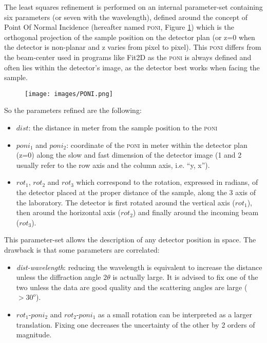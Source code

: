 \documentclass[preprint, pdf]{iucr}              %
\let\caption\foo
\begin{document}
The least squares refinement is performed on an internal parameter-set
containing six  parameters (or seven with the wavelength), defined around the
concept of Point Of Normal Incidence (hereafter named
\textsc{poni}, Figure \ref{poni}) which is the orthogonal projection  of the
sample position on the detector plan (or z=0 when the detector is non-planar and
z varies from pixel to pixel).
This \textsc{poni} differs from the beam-center used in programs like
Fit2D \cite{fit2d} as the \textsc{poni} is always defined and often lies within
the detector's image, as the detector best works when facing the sample.

\begin{figure}
\label{poni}
\begin{center}
\texttt{[image: images/PONI.png]}
\caption{Geometry used internally in pyFAI.}
\end{center}
\end{figure}


So the parameters refined are the following:
\begin{itemize}
  \item $dist$: the distance in meter from the sample position to the
  \textsc{poni}
  \item $poni_1$ and $poni_2$: coordinate of the
  \textsc{poni} in meter within the detector plan (z=0) along the slow and fast
  dimension of the detector image (1 and 2 usually refer to the row axis and
  the column axis, i.e. ``y, x'').
  \item $rot_1$, $rot_2$ and $rot_3$ which correspond to the
  rotation, expressed in radians, of the detector placed at the proper
  distance of the sample, along the 3 axis of the laboratory. The detector is
  first rotated around the vertical axis ($rot_1$), then around the horizontal
  axis ($rot_2$) and finally around the incoming beam ($rot_3$).
\end{itemize}

This parameter-set allows the description of any detector position in space.
The drawback is that some parameters are correlated:
\begin{itemize}
  \item \textit{dist-wavelength}: reducing the wavelength is equivalent to
  increase the distance unless the diffraction angle $2\theta$ is actually
  large. It is advised to fix one of the two unless the data are good
  quality and the scattering angles are large ($>30^o$).
  \item $rot_1$-$poni_2$ and $rot_2$-$poni_1$ as a small rotation can be
  interpreted as a larger translation. Fixing one decreases the uncertainty of
  the other by 2 orders of magnitude.
\end{itemize}
\end{document}
